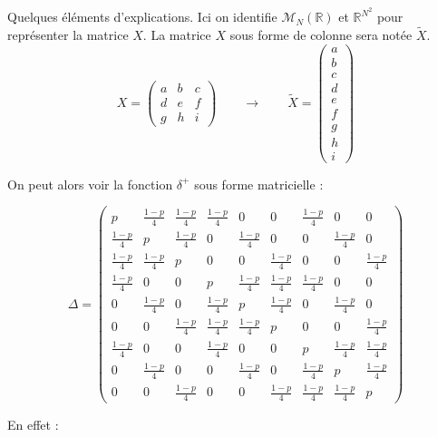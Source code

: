 \documentclass{article}
\begin{document}
Quelques éléments d'explications. Ici on identifie $\mathcal{M}_N(\mathbb{R})$ et $\mathbb{R}^{N^2}$ pour représenter la matrice $X$. La matrice $X$ sous forme de colonne sera notée $\tilde{X}$. \\

$$ X = \begin{pmatrix} a & b & c \\ d & e & f \\ g & h & i \end{pmatrix} \qquad \longrightarrow \qquad \tilde{X} = \left( \begin{array}{c} a \\ b \\ c \\ d \\ e \\ f \\ g \\ h \\ i \end{array} \right)$$

On peut alors voir la fonction $\delta^+$ sous forme matricielle :
 
$$ \Delta =  \begin{pmatrix} p & \frac{1-p}{4} & \frac{1-p}{4} & \frac{1-p}{4} & 0 & 0 & \frac{1-p}{4} & 0 & 0 \\
							\frac{1-p}{4} & p & \frac{1-p}{4} & 0 & \frac{1-p}{4} & 0 & 0 & \frac{1-p}{4} & 0 \\
							\frac{1-p}{4} & \frac{1-p}{4} & p & 0 & 0 & \frac{1-p}{4} & 0 & 0 & \frac{1-p}{4} \\
							\frac{1-p}{4} & 0 & 0 & p & \frac{1-p}{4} & \frac{1-p}{4} & \frac{1-p}{4} & 0 & 0 \\
							0 & \frac{1-p}{4} & 0 & \frac{1-p}{4} & p & \frac{1-p}{4} & 0 & \frac{1-p}{4} & 0 \\
							0 & 0 & \frac{1-p}{4} & \frac{1-p}{4} & \frac{1-p}{4} & p & 0 & 0 & \frac{1-p}{4} \\
							\frac{1-p}{4} & 0 & 0 & \frac{1-p}{4} & 0 & 0 & p & \frac{1-p}{4} & \frac{1-p}{4} \\
							0 & \frac{1-p}{4} & 0 & 0 & \frac{1-p}{4} & 0 & \frac{1-p}{4} & p & \frac{1-p}{4} \\
							0 & 0 & \frac{1-p}{4} & 0 & 0 & \frac{1-p}{4} & \frac{1-p}{4} & \frac{1-p}{4} & p
			\end{pmatrix}$$

En effet : \\
\end{document}
